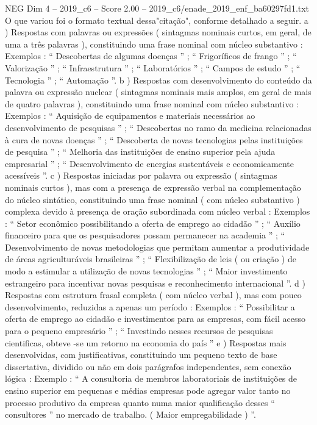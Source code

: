 \begin{textsample}{NEG Dim 4 – 2019\_c6 – Score 2.00 – 2019\_c6/enade\_2019\_enf\_ba60297fd1.txt}
O que variou foi o formato textual dessa"citação", conforme detalhado a seguir. a ) Respostas com palavras ou expressões ( sintagmas nominais curtos, em geral, de uma a três palavras ), constituindo uma frase nominal com núcleo substantivo : Exemplos : “ Descobertas de algumas doenças ” ; “ Frigoríficos de frango ” ; “ Valorização ” ; “ Infraestrutura ” ; “ Laboratórios ” ; “ Campos de estudo ” ; “ Tecnologia ” ; “ Automação ”. b ) Respostas com desenvolvimento do conteúdo da palavra ou expressão nuclear ( sintagmas nominais mais amplos, em geral de mais de quatro palavras ), constituindo uma frase nominal com núcleo substantivo : Exemplos : “ Aquisição de equipamentos e materiais necessários ao desenvolvimento de pesquisas ” ; “ Descobertas no ramo da medicina relacionadas à cura de novas doenças ” ; “ Descoberta de novas tecnologias pelas instituições de pesquisa ” ; “ Melhoria das instituições de ensino superior pela ajuda empresarial ” ; “ Desenvolvimento de energias sustentáveis e economicamente acessíveis ”. c ) Respostas iniciadas por palavra ou expressão ( sintagmas nominais curtos ), mas com a presença de expressão verbal na complementação do núcleo sintático, constituindo uma frase nominal ( com núcleo substantivo ) complexa devido à presença de oração subordinada com núcleo verbal : Exemplos : “ Setor econômico possibilitando a oferta de emprego ao cidadão ” ; “ Auxílio financeiro para que os pesquisadores possam permanecer na academia ” ; “ Desenvolvimento de novas metodologias que permitam aumentar a produtividade de áreas agriculturáveis brasileiras ” ; “ Flexibilização de leis ( ou criação ) de modo a estimular a utilização de novas tecnologias ” ; “ Maior investimento estrangeiro para incentivar novas pesquisas e reconhecimento internacional ”. d ) Respostas com estrutura frasal completa ( com núcleo verbal ), mas com pouco desenvolvimento, reduzidas a apenas um período : Exemplos : “ Possibilitar a oferta de emprego ao cidadão e investimentos para as empresas, com fácil acesso para o pequeno empresário ” ; “ Investindo nesses recursos de pesquisas cientificas, obteve -se um retorno na economia do país ” e ) Respostas mais desenvolvidas, com justificativas, constituindo um pequeno texto de base dissertativa, dividido ou não em dois parágrafos independentes, sem conexão lógica : Exemplo : “ A consultoria de membros laboratoriais de instituições de ensino superior em pequenas e médias empresas pode agregar valor tanto no processo produtivo da empresa quanto numa maior qualificação desses “ consultores ” no mercado de trabalho. ( Maior empregabilidade ) ”.

\end{textsample}
